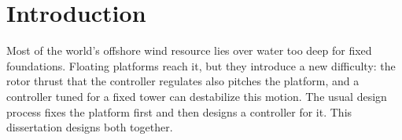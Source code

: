 \chapter{Introduction}
\label{ch:introduction}

Most of the world's offshore wind resource lies over water too deep for fixed foundations.
Floating platforms reach it, but they introduce a new difficulty: the rotor thrust that the
controller regulates also pitches the platform, and a controller tuned for a fixed tower can
destabilize this motion. The usual design process fixes the platform first and then designs a
controller for it. This dissertation designs both together.
